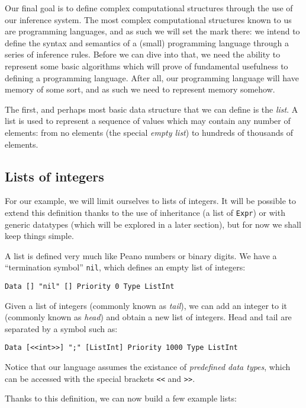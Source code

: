 Our final goal is to define complex computational structures through the use of our inference system. The most complex computational structures known to us are programming languages, and as such we will set the mark there: we intend to define the syntax and semantics of a (small) programming language through a series of inference rules. Before we can dive into that, we need the ability to represent some basic algorithms which will prove of fundamental usefulness to defining a programming language. After all, our programming language will have memory of some sort, and as such we need to represent memory somehow.

The first, and perhaps most basic data structure that we can define is the \textit{list}. A list is used to represent a sequence of values which may contain any number of elements: from no elements (the special \textit{empty list}) to hundreds of thousands of elements.

\subsection{Lists of integers}
For our example, we will limit ourselves to lists of integers. It will be possible to extend this definition thanks to the use of inheritance (a list of \texttt{Expr}) or with generic datatypes (which will be explored in a later section), but for now we shall keep things simple.

A list is defined very much like Peano numbers or binary digits. We have a ``termination symbol'' \texttt{nil}, which defines an empty list of integers:

\begin{lstlisting}
Data [] "nil" [] Priority 0 Type ListInt
\end{lstlisting}

Given a list of integers (commonly known as \textit{tail}), we can add an integer to it (commonly known as \textit{head}) and obtain a new list of integers. Head and tail are separated by a symbol such as:

\begin{lstlisting}
Data [<<int>>] ";" [ListInt] Priority 1000 Type ListInt
\end{lstlisting}

Notice that our language assumes the existance of \textit{predefined data types}, which can be accessed with the special brackets \texttt{<<} and \texttt{>>}.

Thanks to this definition, we can now build a few example lists:

